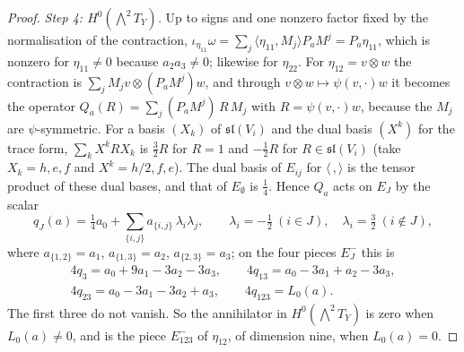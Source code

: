 \begin{proof}
\emph{Step 4: $H^{0}({\textstyle\bigwedge^{2}}T_{Y})$.} Up to signs and one
nonzero factor fixed by the normalisation of the contraction,
$\iota_{\eta_{11}}\omega=\sum_{j}\langle\eta_{11},M_{j}\rangle P_{a}M^{j}=
P_{a}\eta_{11}$, which is nonzero for $\eta_{11}\ne0$ because $a_{2}a_{3}\ne0$;
likewise for $\eta_{22}$. For $\eta_{12}=v\otimes w$ the contraction is
$\sum_{j}M_{j}v\otimes(P_{a}M^{j})w$, and through $v\otimes w\mapsto
\psi(v,\cdot)w$ it becomes the operator $Q_{a}(R)=\sum_{j}(P_{a}M^{j})\,R\,
M_{j}$ with $R=\psi(v,\cdot)w$, because the $M_{j}$ are $\psi$-symmetric.
For a basis $(X_{k})$ of $\mathfrak{sl}(V_{i})$ and the dual basis $(X^{k})$
for the trace form, $\sum_{k}X^{k}RX_{k}$ is $\frac32R$ for $R=1$ and
$-\frac12R$ for $R\in\mathfrak{sl}(V_{i})$ (take $X_{k}=h,e,f$ and $X^{k}=h/2,
f,e$). The dual basis of $E_{ij}$ for $\langle\,,\rangle$ is the tensor
product of these dual bases, and that of $E_{\emptyset}$ is $\frac14$. Hence
$Q_{a}$ acts on $E_{J}$ by the scalar
\[
  q_{J}(a)=\tfrac14a_{0}+\sum_{\{i,j\}}a_{\{i,j\}}\,\lambda_{i}\lambda_{j},
  \qquad\lambda_{i}=-\tfrac12\ (i\in J),\quad\lambda_{i}=\tfrac32\
  (i\notin J),
\]
where $a_{\{1,2\}}=a_{1}$, $a_{\{1,3\}}=a_{2}$, $a_{\{2,3\}}=a_{3}$; on the four
pieces $E_{J}^{-}$ this is
\begin{gather*}
  4q_{3}=a_{0}+9a_{1}-3a_{2}-3a_{3},\qquad
  4q_{13}=a_{0}-3a_{1}+a_{2}-3a_{3},\\
  4q_{23}=a_{0}-3a_{1}-3a_{2}+a_{3},\qquad
  4q_{123}=L_{0}(a).
\end{gather*}
The first three do not vanish. So the annihilator in
$H^{0}({\textstyle\bigwedge^{2}}T_{Y})$ is zero when $L_{0}(a)\ne0$, and is the
piece $E_{123}^{-}$ of $\eta_{12}$, of dimension nine, when $L_{0}(a)=0$.


\end{proof}

